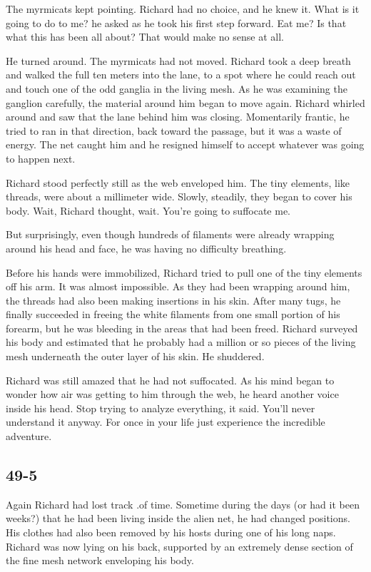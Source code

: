 \documentclass[]{article}
\begin{document}
{{The myrmicats kept pointing.  Richard had no choice, and he knew it.  What is it going to do to me? he asked as he took his first step forward.  Eat me? Is that what this has been all about? That would make no sense at all.

He turned around.  The myrmicats had not moved.  Richard took a deep breath and walked the full ten meters into the lane, to a spot where he could reach out and touch one of the odd ganglia in the living mesh.  As he was examining the ganglion carefully, the material around him began to move again.  Richard whirled around and saw that the lane behind him was closing.  Momentarily frantic, he tried to ran in that direction, back toward the passage, but it was a waste of energy.  The net caught him and he resigned himself to accept whatever was going to happen next.

Richard stood perfectly still as the web enveloped him.  The tiny elements, like threads, were about a millimeter wide.  Slowly, steadily, they began to cover his body.  Wait, Richard thought, wait.  You’re going to suffocate me.

But surprisingly, even though hundreds of filaments were already wrapping around his head and face, he was having no difficulty breathing.

Before his hands were immobilized, Richard tried to pull one of the tiny elements off his arm.  It was almost impossible.  As they had been wrapping around him, the threads had also been making insertions in his skin.  After many tugs, he finally succeeded in freeing the white filaments from one small portion of his forearm, but he was bleeding in the areas that had been freed.  Richard surveyed his body and estimated that he probably had a million or so pieces of the living mesh underneath the outer layer of his skin.  He shuddered.

Richard was still amazed that he had not suffocated.  As his mind began to wonder how air was getting to him through the web, he heard another voice inside his head.  Stop trying to analyze everything, it said.  You’ll never understand it anyway.  For once in your life just experience the incredible adventure.

	
\subsection*{49-5}

Again Richard had lost track .of time.  Sometime during the days (or had it been weeks?) that he had been living inside the alien net, he had changed positions.  His clothes had also been removed by his hosts during one of his long naps.  Richard was now lying on his back, supported by an extremely dense section of the fine mesh network enveloping his body.

}}
\end{document}
